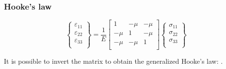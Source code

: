 \documentclass[notes]{beamer}
\begin{document}
\begin{frame}
\frametitle{Hooke's law}

\begin{equation*}
	\begin{Bmatrix}
		\varepsilon_{11}\\
		\varepsilon_{22}\\
		\varepsilon_{33}\\
	\end{Bmatrix} = \frac{1}{E}
	\begin{bmatrix}
		1 & -\mu & -\mu \\
		-\mu & 1 & -\mu \\
		-\mu & -\mu & 1 \\
	\end{bmatrix}
	\begin{Bmatrix}
		\sigma_{11}\\
		\sigma_{22}\\
		\sigma_{33}\\
	\end{Bmatrix}
\end{equation*}

It is possible to invert the matrix to obtain the generalized Hooke's law: .


\end{frame}
\end{document}
